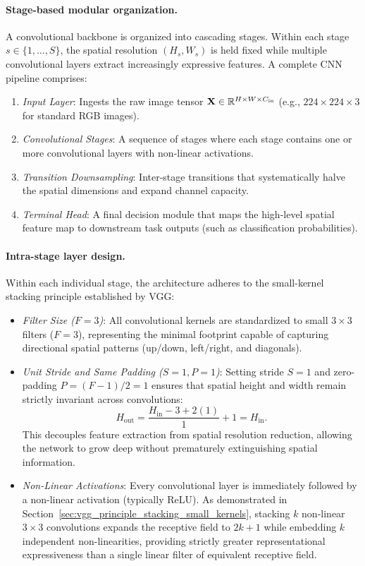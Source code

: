 \paragraph{Stage-based modular organization.}
A convolutional backbone is organized into cascading stages. Within each stage $s \in \{1, \dots, S\}$, the spatial resolution $(H_s, W_s)$ is held fixed while multiple convolutional layers extract increasingly expressive features. A complete CNN pipeline comprises:
\begin{enumerate}[leftmargin=*]
  \item \textit{Input Layer}: Ingests the raw image tensor $\mathbf{X} \in \mathbb{R}^{H \times W \times C_{\text{in}}}$ (e.g., $224 \times 224 \times 3$ for standard RGB images).
  \item \textit{Convolutional Stages}: A sequence of stages where each stage contains one or more convolutional layers with non-linear activations.
  \item \textit{Transition Downsampling}: Inter-stage transitions that systematically halve the spatial dimensions and expand channel capacity.
  \item \textit{Terminal Head}: A final decision module that maps the high-level spatial feature map to downstream task outputs (such as classification probabilities).
\end{enumerate}

\paragraph{Intra-stage layer design.}
Within each individual stage, the architecture adheres to the small-kernel stacking principle established by VGG:
\begin{itemize}[leftmargin=*]
  \item \textit{Filter Size ($F = 3$)}: All convolutional kernels are standardized to small $3 \times 3$ filters ($F=3$), representing the minimal footprint capable of capturing directional spatial patterns (up/down, left/right, and diagonals).
  \item \textit{Unit Stride and Same Padding ($S=1, P=1$)}: Setting stride $S = 1$ and zero-padding $P = (F-1)/2 = 1$ ensures that spatial height and width remain strictly invariant across convolutions:
    \begin{equation}
    H_{\text{out}} = \frac{H_{\text{in}} - 3 + 2(1)}{1} + 1 = H_{\text{in}}.
    \end{equation}
    This decouples feature extraction from spatial resolution reduction, allowing the network to grow deep without prematurely extinguishing spatial information.
  \item \textit{Non-Linear Activations}: Every convolutional layer is immediately followed by a non-linear activation (typically ReLU). As demonstrated in Section~\ref{sec:vgg_principle_stacking_small_kernels}, stacking $k$ non-linear $3 \times 3$ convolutions expands the receptive field to $2k + 1$ while embedding $k$ independent non-linearities, providing strictly greater representational expressiveness than a single linear filter of equivalent receptive field.
\end{itemize}

